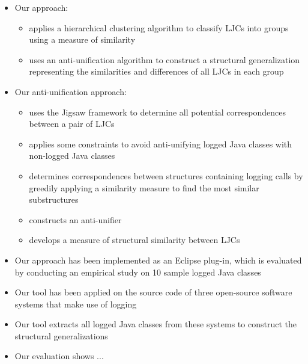 \begin{itemize} [leftmargin=.01in]
\item{Our approach:}
\begin{itemize} [leftmargin=.3in]
\item applies a hierarchical clustering algorithm to classify LJCs into groups using a measure of similarity
\item uses an anti-unification algorithm to construct a structural generalization representing the similarities and differences of all LJCs in each group
\end{itemize}

\item{Our anti-unification approach:}
\begin{itemize} [leftmargin=.3in]
\item uses the Jigsaw framework to determine all potential correspondences between a pair of LJCs
\item applies some constraints to avoid anti-unifying logged Java classes with non-logged Java classes
\item determines correspondences between structures containing logging calls by greedily applying a similarity measure to find the most similar substructures
\item constructs an anti-unifier
\item develops a measure of structural similarity between LJCs
\end{itemize}
\item Our approach has been implemented as an Eclipse plug-in, which is evaluated by conducting an empirical study on 10 sample logged Java classes
\item Our tool has been applied on the source code of three open-source software systems that make use of logging
\item Our tool extracts all logged Java classes from these systems to construct the structural generalizations
\item Our evaluation shows ...


\end{itemize}
